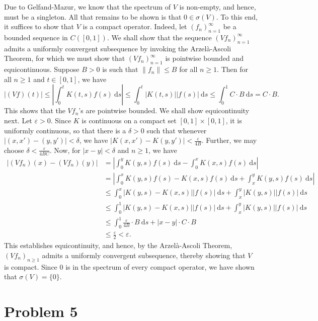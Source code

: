 \documentclass[11pt]{article}
\theoremstyle{thmstyle}
\theoremstyle{defstyle}
\renewcommand{\le}{\leqslant}
\renewcommand{\ge}{\geqslant}
\begin{document}
Due to Gelfand-Mazur, we know that the spectrum of $V$ is non-empty, and hence, must be a singleton. All that remains to be shown is that $0\in\sigma(V)$. To this end, it suffices to show that $V$ is a compact operator. Indeed, let $(f_n)_{n = 1}^\infty$ be a bounded sequence in $C([0, 1])$. We shall show that the sequence $\left(Vf_n\right)_{n = 1}^\infty$ admits a uniformly convergent subsequence by invoking the Arzel\`a-Ascoli Theorem, for which we must show that $(Vf_n)_{n = 1}^\infty$ is pointwise bounded and equicontinuous. 
Suppose $B > 0$ is such that $\|f_n\|\le B$ for all $n\ge 1$. Then for all $n\ge 1$ and $t\in [0, 1]$, we have 
\begin{equation*}
    |(Vf)(t)|\le\left|\int_0^t K(t, s)f(s)~\mathrm ds\right|\le \int_0^t |K(t, s)| |f(s)|~\mathrm ds\le \int_0^1 C\cdot B~\mathrm ds = C\cdot B.
\end{equation*}
This shows that the $Vf_n$'s are pointwise bounded. We shall show equicontinuity next. Let $\varepsilon > 0$. Since $K$ is continuous on a compact set $[0, 1]\times[0, 1]$, it is uniformly continuous, so that there is a $\delta > 0$ such that whenever $|(x, x') - (y, y')| < \delta$, we have $\left|K(x, x') - K(y, y')\right| < \frac{\varepsilon}{4B}$. Further, we may choose $\delta < \frac{\varepsilon}{4BC}$. Now, for $|x - y| < \delta$ and $n\ge 1$, we have 
\begin{align*}
    \left|(Vf_n)(x) - (Vf_n)(y)\right| &= \left|\int_0^y K(y, s)f(s)~\mathrm ds - \int_0^x K(x, s)f(s)~\mathrm ds\right|\\
    &= \left|\int_0^x K(y, s)f(s) - K(x, s)f(s)~\mathrm ds + \int_x^y K(y, s)f(s)~\mathrm ds\right|\\
    &\le \int_0^x |K(y, s) - K(x, s)||f(s)|~\mathrm ds + \int_x^y |K(y, s)||f(s)|~\mathrm ds\\
    &\le \int_0^1 |K(y, s) - K(x, s)||f(s)|~\mathrm ds + \int_x^y |K(y, s)||f(s)|~\mathrm ds\\
    &\le\int_0^1\frac{\varepsilon}{4B}\cdot B~\mathrm ds + |x - y|\cdot C\cdot B\\
    &\le \frac{\varepsilon}{2} < \varepsilon.
\end{align*}
This establishes equicontinuity, and hence, by the Arzel\`a-Ascoli Theorem, $\left(Vf_n\right)_{n\ge 1}$ admits a uniformly convergent subsequence, thereby showing that $V$ is compact. Since $0$ is in the spectrum of every compact operator, we have shown that $\sigma(V) = \{0\}$.

\section{Problem 5}
\end{document}
